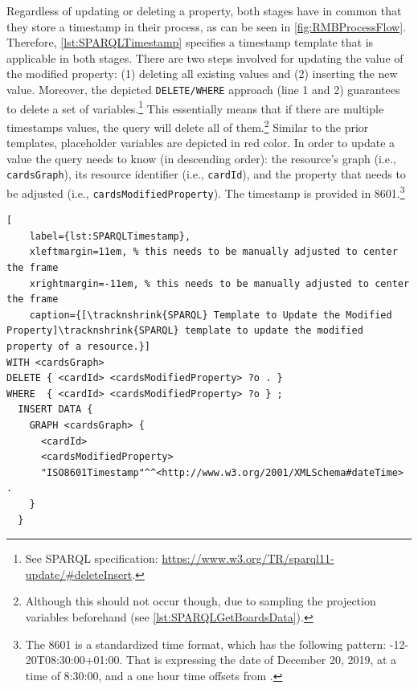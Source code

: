 \noindent Regardless of updating or deleting a property, both stages have in common that they store a timestamp in their process, as can be seen in \autoref{fig:RMBProcessFlow}. Therefore, \autoref{lst:SPARQLTimestamp} specifies a timestamp template that is applicable in both stages. There are two steps involved for updating the value of the modified property: (1) deleting all existing values and (2) inserting the new value. Moreover, the depicted \texttt{DELETE/WHERE} approach (line 1 and 2) guarantees to delete a set of variables.\footnote{See \acrshort*{SPARQL} specification: \url{https://www.w3.org/TR/sparql11-update/\#deleteInsert}.} This essentially means that if there are multiple timestamps values, the query will delete all of them.\footnote{Although this should not occur though, due to sampling the projection variables beforehand (see \autoref{lst:SPARQLGetBoardsData}).} Similar to the prior templates, placeholder variables are depicted in red color. In order to update a value the query needs to know (in descending order): the resource’s graph (i.e., \texttt{cardsGraph}), its resource identifier (i.e., \texttt{cardId}), and the property that needs to be adjusted (i.e., \texttt{cardsModifiedProperty}). The timestamp is provided in  8601.\footnote{The  8601 is a standardized time format, which has the following pattern: -12-20T08:30:00+01:00\libertineOsF. That is expressing the date of December 20, 2019, at a time of 8:30:00, and a one hour time offsets from .}


\begin{spacing}{0.9}
    \lstset{language=SPARQL,escapechar=|}
    \begin{lstlisting}[
    label={lst:SPARQLTimestamp},
    xleftmargin=11em, % this needs to be manually adjusted to center the frame
    xrightmargin=-11em, % this needs to be manually adjusted to center the frame
    caption={[\tracknshrink{SPARQL} Template to Update the Modified Property]\tracknshrink{SPARQL} template to update the modified property of a resource.}]
WITH <cardsGraph>
DELETE { <cardId> <cardsModifiedProperty> ?o . }
WHERE  { <cardId> <cardsModifiedProperty> ?o } ;
  INSERT DATA {
    GRAPH <cardsGraph> {
      <cardId>
      <cardsModifiedProperty>
      "ISO8601Timestamp"^^<http://www.w3.org/2001/XMLSchema#dateTime> .
    }
  }
\end{lstlisting}
\end{spacing}



